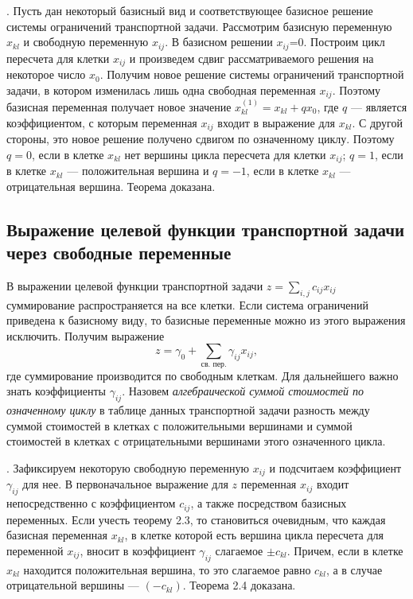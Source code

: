 . Пусть дан некоторый базисный вид и соответствующее базисное решение системы ограничений транспортной задачи. Рассмотрим базисную переменную $x_{kl}$  и свободную переменную $x_{ij}$. В базисном решении $x_{ij}$=0. Построим цикл пересчета для клетки $x_{ij}$ и произведем сдвиг рассматриваемого решения на некоторое число $x_0$. Получим новое решение системы ограничений транспортной задачи, в котором изменилась лишь одна свободная переменная $x_{ij}$. Поэтому базисная переменная получает новое значение  $x_{kl}^{(1)} = x_{kl} + qx_0$, где $q$ — является коэффициентом, с которым переменная $x_{ij}$ входит в выражение для $x_{kl}$. С другой стороны, это новое решение получено сдвигом по означенному циклу.  Поэтому  $q = 0$,  если в  клетке  $x_{kl}$  нет вершины цикла  пересчета  для  клетки $x_{ij}$; $q = 1$, если в клетке $x_{kl}$ — положительная вершина и $q = -1$, если в клетке $x_{kl}$ — отрицательная вершина. Теорема доказана.
\subsection{Выражение целевой функции транспортной задачи через свободные переменные}

В выражении целевой функции транспортной задачи ${z = \sum_{i,j}c_{ij}x_{ij}}$ суммирование распространяется на все клетки. Если система ограничений приведена к базисному виду, то базисные переменные можно из этого выражения исключить. Получим выражение
$$z = \gamma_0 + \sum_\text{св. пер.}\gamma_{ij}x_{ij},$$
где суммирование производится по свободным клеткам. Для дальнейшего важно знать коэффициенты $\gamma_{ij}$. Назовем {\it алгебраической суммой стоимостей по означенному циклу} в таблице данных транспортной задачи разность между суммой стоимостей в клетках с положительными вершинами и суммой стоимостей в клетках с отрицательными вершинами этого означенного цикла.


. Зафиксируем некоторую свободную переменную $x_{ij}$ и подсчитаем коэффициент $\gamma_{ij}$ для нее. В первоначальное выражение для $z$ переменная $x_{ij}$ входит непосредственно с коэффициентом $c_{ij}$, а также посредством базисных переменных. Если учесть теорему 2.3, то становиться очевидным, что каждая базисная переменная $x_{kl}$, в клетке которой есть вершина цикла пересчета для переменной $x_{ij}$, вносит в коэффициент $\gamma_{ij}$ слагаемое $\pm c_{kl}$. Причем, если в клетке $x_{kl}$ находится положительная вершина, то это слагаемое равно $c_{kl}$, а в случае отрицательной вершины — $(-c_{kl})$. Теорема 2.4 доказана. %
